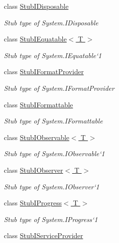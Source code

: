\begin{DoxyCompactItemize}
class \hyperlink{class_system_1_1_fakes_1_1_stub_i_disposable}{Stub\-I\-Disposable}
\begin{DoxyCompactList}\small\item\em Stub type of System.\-I\-Disposable\end{DoxyCompactList}\item 
class \hyperlink{class_system_1_1_fakes_1_1_stub_i_equatable_3_01_t_01_4}{Stub\-I\-Equatable$<$ T $>$}
\begin{DoxyCompactList}\small\item\em Stub type of System.\-I\-Equatable`1\end{DoxyCompactList}\item 
class \hyperlink{class_system_1_1_fakes_1_1_stub_i_format_provider}{Stub\-I\-Format\-Provider}
\begin{DoxyCompactList}\small\item\em Stub type of System.\-I\-Format\-Provider\end{DoxyCompactList}\item 
class \hyperlink{class_system_1_1_fakes_1_1_stub_i_formattable}{Stub\-I\-Formattable}
\begin{DoxyCompactList}\small\item\em Stub type of System.\-I\-Formattable\end{DoxyCompactList}\item 
class \hyperlink{class_system_1_1_fakes_1_1_stub_i_observable_3_01_t_01_4}{Stub\-I\-Observable$<$ T $>$}
\begin{DoxyCompactList}\small\item\em Stub type of System.\-I\-Observable`1\end{DoxyCompactList}\item 
class \hyperlink{class_system_1_1_fakes_1_1_stub_i_observer_3_01_t_01_4}{Stub\-I\-Observer$<$ T $>$}
\begin{DoxyCompactList}\small\item\em Stub type of System.\-I\-Observer`1\end{DoxyCompactList}\item 
class \hyperlink{class_system_1_1_fakes_1_1_stub_i_progress_3_01_t_01_4}{Stub\-I\-Progress$<$ T $>$}
\begin{DoxyCompactList}\small\item\em Stub type of System.\-I\-Progress`1\end{DoxyCompactList}\item 
class \hyperlink{class_system_1_1_fakes_1_1_stub_i_service_provider}{Stub\-I\-Service\-Provider}

\end{DoxyCompactItemize}
